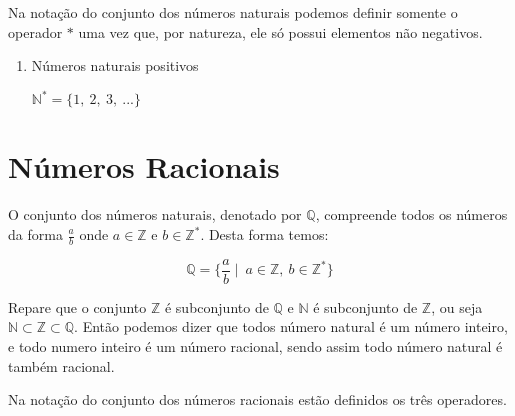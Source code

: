 \documentclass[]{book}
\begin{document}
Na notação do conjunto dos números naturais podemos definir somente o
operador \(*\) uma vez que, por natureza, ele só possui elementos não
negativos.

\begin{enumerate}
\def\labelenumi{\arabic{enumi}.}
\item
  Números naturais positivos

  \(\mathbb{N}^{*} = \{ 1,\ 2,\ 3,\ ... \}\)
\end{enumerate}

\section{Números Racionais}\label{numeros-racionais}

O conjunto dos números naturais, denotado por \(\mathbb{Q}\), compreende
todos os números da forma \(\frac{a}{b}\) onde \(a \in \mathbb{Z}\) e
\(b \in \mathbb{Z}^{*}\). Desta forma temos:

\[\mathbb{Q} = \{ \frac{a}{b} \mid \ a \in \mathbb{Z},\ b \in \mathbb{Z}^{*} \}\]

Repare que o conjunto \(\mathbb{Z}\) é subconjunto de \(\mathbb{Q}\) e
\(\mathbb{N}\) é subconjunto de \(\mathbb{Z}\), ou seja
\(\mathbb{N} \subset \mathbb{Z} \subset \mathbb{Q}\). Então podemos
dizer que todos número natural é um número inteiro, e todo numero
inteiro é um número racional, sendo assim todo número natural é também
racional.

Na notação do conjunto dos números racionais estão definidos os três
operadores.
\end{document}
